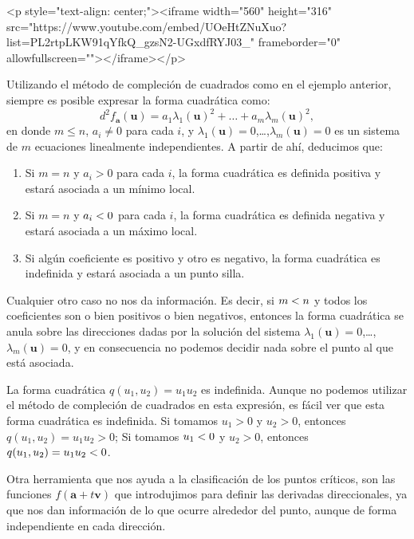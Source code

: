 \begin{rawhtml}
<p style="text-align: center;"><iframe width="560" height="316" src="https://www.youtube.com/embed/UOeHtZNuXuo?list=PL2rtpLKW91qYfkQ_gzsN2-UGxdfRYJ03_" frameborder="0" allowfullscreen=""></iframe></p>
\end{rawhtml}

Utilizando el método de compleción de cuadrados como en el ejemplo anterior, siempre es posible expresar la forma cuadrática como:
\[
d^2f_{\boldsymbol a}(\boldsymbol u)=a_1\lambda_1(\boldsymbol u)^2+\dots+a_m\lambda_m(\boldsymbol u)^2,
\]
en donde $m\le n$, $a_i\ne0$ para cada $i$, y $\lambda_1(\boldsymbol u)=0$,\dots,$\lambda_m(\boldsymbol u)=0$ es un sistema de $m$ ecuaciones linealmente independientes.
A partir de ahí, deducimos que:
\begin{enumerate}
\item
Si $m=n$ y $a_i>0$ para cada $i$, la forma cuadrática es definida positiva y estará asociada a un mínimo local.
\item
Si $m=n$ y $a_i< 0$ para cada $i$, la forma cuadrática es definida negativa y estará asociada a un máximo local.
\item
Si algún coeficiente es positivo y otro es negativo, la forma cuadrática es indefinida y estará asociada a un punto silla.
\end{enumerate}
%
Cualquier otro caso no nos da información.
Es decir, si $m< n$ y todos los coeficientes son o bien positivos o bien negativos, entonces la forma cuadrática se anula sobre las direcciones dadas por la solución del sistema $\lambda_1(\boldsymbol u)=0$,\dots,$\lambda_m(\boldsymbol u)=0$, y en consecuencia no podemos decidir nada sobre el punto al que está asociada.

\begin{ejemplo}
La forma cuadrática $q(u_1,u_2)=u_1u_2$ es indefinida.
Aunque no podemos utilizar el método de compleción de cuadrados en esta expresión, es fácil ver que esta forma cuadrática es indefinida. Si tomamos $u_1>0$ y $u_2>0$, entonces $q(u_1,u_2)=u_1u_2>0$;
Si tomamos $u_1< 0$ y $u_2>0$, entonces $q(u_1,u_2)=u_1u_2< 0$.\fej
\end{ejemplo}

Otra herramienta que nos ayuda a la clasificación de los puntos críticos, son las funciones
$f(\boldsymbol a+t\boldsymbol v)$
que introdujimos para definir las derivadas direccionales, ya que nos dan información de lo que ocurre alrededor del punto, aunque de forma independiente en cada dirección.

